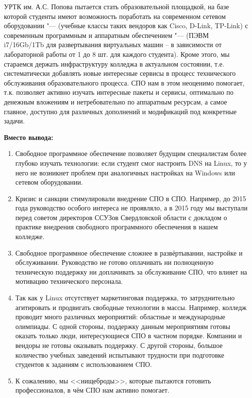 \documentclass[10pt, a5paper]{article}
\begin{document}
УРТК им. А.С. Попова пытается стать образовательной площадкой, на базе которой  студенты имеют возможность поработать на современном сетевом оборудовании "--- (учебные классы таких вендоров как Cisco, D-Link, TP-Link) с современным программным и аппаратным обеспечением "--- (ПЭВМ i7/16Gb/1Tb для развертывания виртуальных машин – в зависимости от лабораторной работы от 1 до 8 шт. для каждого студента). Кроме этого, мы стараемся держать инфраструктуру колледжа в актуальном состоянии, т.е. систематически добавлять новые интересные сервисы в процесс технического обслуживания образовательного процесса. СПО нам в этом неоценимо помогает, т.к. позволяет активно изучать интересные пакеты и сервисы, оптимально по денежным вложениям и нетребовательно по аппаратным ресурсам, а самое главное, доступно для различных дополнений и модификаций  под конкретные задачи.

\textbf{Вместо вывода:}

\begin{enumerate}
  \item Свободное программное обеспечение позволяет будущим специалистам более глубоко изучать технологии: если студент смог настроить DNS на Linux, то у него не возникнет проблем при аналогичных настройках на Windows или сетевом оборудовании.
  \item Кризис и санкции стимулировали внедрение СПО в СПО. Например, до 2015 года руководство особого интереса не проявляло, а в 2015 году мы выступали перед советом директоров ССУЗов Свердловской области с докладом о практике внедрения свободного программного обеспечения в нашем колледже.
  \item Свободное программное обеспечение сложнее в развёртывании, настройке и обслуживании. Руководство не готово оплачивать ни полноценную техническую поддержку ни доплачивать за обслуживание СПО, что влияет на мотивацию технического персонала.
  \item Так как у Linux отсутствует маркетинговая поддержка, то затруднительно агитировать и продвигать свободные технологии в массы. Например, колледж проводит много различных мероприятий: областные и международные олимпиады. С одной стороны, поддержку данным мероприятиям готовы оказать только люди, интересующиеся СПО в частном порядке. Компании и вендоры не готовы оказывать поддержку. С другой стороны, большое количество учебных заведений испытывают трудности при подготовке студентов к заданиям с использованием CПО.
  \item К сожалению, мы <<нищеброды>>, которые пытаются готовить профессионалов, в чём СПО нам активно помогает.
\end{enumerate}
\end{document}
